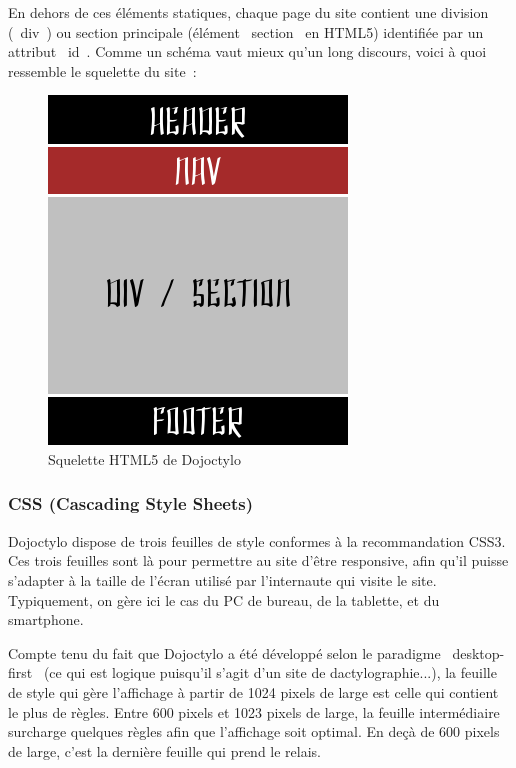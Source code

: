 \documentclass[a4paper,12pt]{article}
\begin{document}
En dehors de ces éléments statiques, chaque page du site contient une division (\og~div~\fg) ou section principale (élément \og~section~\fg{} en HTML5) identifiée par un attribut \og~id~\fg. Comme un schéma vaut mieux qu'un long discours, voici à quoi ressemble le squelette du site~:

\newpage

\begin{figure}[!h]
\begin{center}
\includegraphics{structure.png}
\end{center}
\caption{Squelette HTML5 de Dojoctylo}
\end{figure}

\newpage

\subsubsection{CSS (Cascading Style Sheets)}

Dojoctylo dispose de trois feuilles de style conformes à la recommandation CSS3. Ces trois feuilles sont là pour permettre au site d'être responsive, afin qu'il puisse s'adapter à la taille de l'écran utilisé par l'internaute qui visite le site. Typiquement, on gère ici le cas du PC de bureau, de la tablette, et du smartphone.

Compte tenu du fait que Dojoctylo a été développé selon le paradigme \og~desktop-first~\fg{} (ce qui est logique puisqu'il s'agit d'un site de dactylographie...), la feuille de style qui gère l'affichage à partir de 1024 pixels de large est celle qui contient le plus de règles. Entre 600 pixels et 1023 pixels de large, la feuille intermédiaire surcharge quelques règles afin que l'affichage soit optimal. En deçà de 600 pixels de large, c'est la dernière feuille qui prend le relais.
\end{document}
